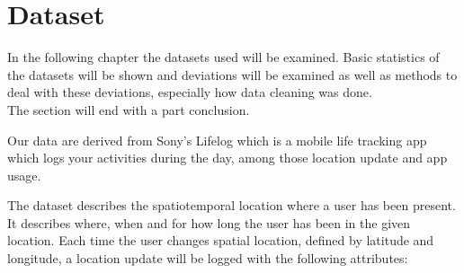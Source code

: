 \chapter{Dataset}
\label{chap:dataset}
In the following chapter the datasets used will be examined. Basic statistics of the datasets will be shown and deviations will be examined as well as methods to deal with these deviations, especially how data cleaning was done. \\
The section will end with a part conclusion. 

Our data are derived from Sony's Lifelog\cite{sonyLifeLog} which is a mobile life tracking app which logs your activities during the day, among those location update and app usage. 

The dataset describes the spatiotemporal location where a user has been present. It describes where, when and for how long the user has been in the given location. Each time the user changes spatial location, defined by latitude and longitude, a location update will be logged with the following attributes: 

